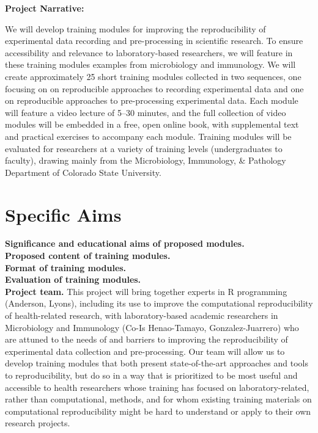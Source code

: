 \documentclass[pdftex,english,12pt,parskip=half]{scrartcl}
\begin{document}
\clearpage

{\large \textbf{Project Narrative:}}

We will develop training modules for improving the reproducibility of experimental data recording and pre-processing in scientific research. To ensure accessibility and relevance to laboratory-based researchers, we will feature in these training modules examples from microbiology and immunology. We will create approximately 25 short training modules collected in two sequences, one focusing on on reproducible approaches to recording experimental data and one on reproducible approaches to pre-processing experimental data. Each module will feature a video lecture of 5--30 minutes, and the full collection of video modules will be embedded in a free, open online book, with supplemental text and practical exercises to accompany each module. Training modules will be evaluated for researchers at a variety of training levels (undergraduates to faculty), drawing mainly from the Microbiology, Immunology, \& Pathology Department of Colorado State University.


\clearpage

\section*{Specific Aims}
\begingroup
    \fontsize{11pt}{12pt}\selectfont 

\textbf{Significance and educational aims of proposed modules.} \\

\textbf{Proposed content of training modules.} \\

\textbf{Format of training modules.} \\

\textbf{Evaluation of training modules.} \\

\textbf{Project team.}  This project will bring together experts in R programming (Anderson, Lyons), including its use to improve the computational reproducibility of health-related research, with laboratory-based academic researchers in Microbiology and Immunology (Co-Is Henao-Tamayo, Gonzalez-Juarrero) who are attuned to the needs of and barriers to improving the reproducibility of experimental data collection and pre-processing. Our team will allow us to develop training modules that both present state-of-the-art approaches and tools to reproducibility, but do so in a way that is prioritized to be most useful and accessible to health researchers whose training has focused on laboratory-related, rather than computational, methods, and for whom existing training materials on computational reproducibility might be hard to understand or apply to their own research projects. 
\end{document}
